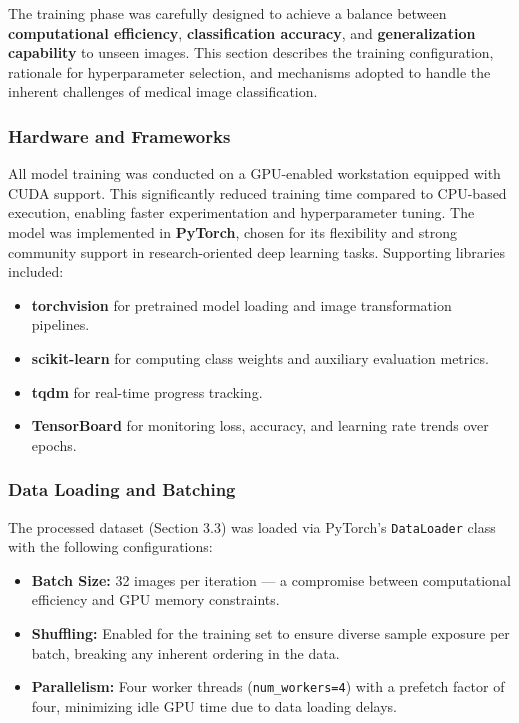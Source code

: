\documentclass[
  12pt,
  oneside]{article}
\providecommand{\tightlist}{%
  \setlength{\itemsep}{0pt}\setlength{\parskip}{0pt}}
\begin{document}
The training phase was carefully designed to achieve a balance between
\textbf{computational efficiency}, \textbf{classification accuracy}, and
\textbf{generalization capability} to unseen images. This section
describes the training configuration, rationale for hyperparameter
selection, and mechanisms adopted to handle the inherent challenges of
medical image classification.

\subsubsection{Hardware and Frameworks}\label{hardware-and-frameworks}

All model training was conducted on a GPU-enabled workstation equipped
with CUDA support. This significantly reduced training time compared to
CPU-based execution, enabling faster experimentation and hyperparameter
tuning. The model was implemented in \textbf{PyTorch}, chosen for its
flexibility and strong community support in research-oriented deep
learning tasks. Supporting libraries included:

\begin{itemize}
\tightlist
\item
  \textbf{torchvision} for pretrained model loading and image
  transformation pipelines.
\item
  \textbf{scikit-learn} for computing class weights and auxiliary
  evaluation metrics.
\item
  \textbf{tqdm} for real-time progress tracking.
\item
  \textbf{TensorBoard} for monitoring loss, accuracy, and learning rate
  trends over epochs.
\end{itemize}

\subsubsection{Data Loading and
Batching}\label{data-loading-and-batching}

The processed dataset (Section 3.3) was loaded via PyTorch's
\texttt{DataLoader} class with the following configurations:

\begin{itemize}
\tightlist
\item
  \textbf{Batch Size:} 32 images per iteration --- a compromise between
  computational efficiency and GPU memory constraints.
\item
  \textbf{Shuffling:} Enabled for the training set to ensure diverse
  sample exposure per batch, breaking any inherent ordering in the data.
\item
  \textbf{Parallelism:} Four worker threads (\texttt{num\_workers=4})
  with a prefetch factor of four, minimizing idle GPU time due to data
  loading delays.
\end{itemize}
\end{document}
